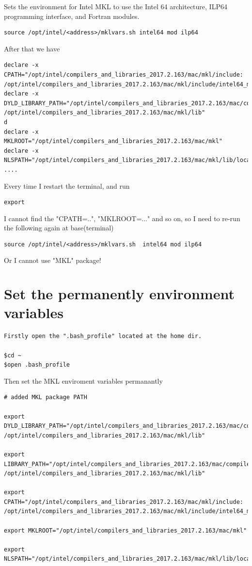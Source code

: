 Sets the environment for Intel MKL to use the Intel 64 architecture, ILP64 programming interface, and Fortran modules.
\begin{verbatim}
source /opt/intel/<address>/mklvars.sh intel64 mod ilp64
\end{verbatim}

After that we have 
\begin{verbatim}
declare -x CPATH="/opt/intel/compilers_and_libraries_2017.2.163/mac/mkl/include:
/opt/intel/compilers_and_libraries_2017.2.163/mac/mkl/include/intel64_mac/ilp64"
declare -x DYLD_LIBRARY_PATH="/opt/intel/compilers_and_libraries_2017.2.163/mac/compiler/lib:
/opt/intel/compilers_and_libraries_2017.2.163/mac/mkl/lib"
d
declare -x MKLROOT="/opt/intel/compilers_and_libraries_2017.2.163/mac/mkl"
declare -x NLSPATH="/opt/intel/compilers_and_libraries_2017.2.163/mac/mkl/lib/locale/%l_%t/%N"
....
\end{verbatim}

Every time I restart the terminal,  and run 
\begin{verbatim}
export
\end{verbatim}
I cannot find the "CPATH=..", "MKLROOT=..." and so on, so I need to re-run the following again at base(terminal)
\begin{verbatim}
source /opt/intel/<address>/mklvars.sh  intel64 mod ilp64
\end{verbatim}
Or I cannot use "MKL" package!

\section{Set the permanently environment variables}

\begin{verbatim}
Firstly open the ".bash_profile" located at the home dir. 

$cd ~
$open .bash_profile
\end{verbatim}

Then set the MKL enviroment variables permanantly

\begin{verbatim}
# added MKL package PATH

export DYLD_LIBRARY_PATH="/opt/intel/compilers_and_libraries_2017.2.163/mac/compiler/lib:
/opt/intel/compilers_and_libraries_2017.2.163/mac/mkl/lib"

export LIBRARY_PATH="/opt/intel/compilers_and_libraries_2017.2.163/mac/compiler/lib:
/opt/intel/compilers_and_libraries_2017.2.163/mac/mkl/lib"

export CPATH="/opt/intel/compilers_and_libraries_2017.2.163/mac/mkl/include:
/opt/intel/compilers_and_libraries_2017.2.163/mac/mkl/include/intel64_mac/ilp64"

export MKLROOT="/opt/intel/compilers_and_libraries_2017.2.163/mac/mkl"

export NLSPATH="/opt/intel/compilers_and_libraries_2017.2.163/mac/mkl/lib/locale/%l_%t/%N"

\end{verbatim}

